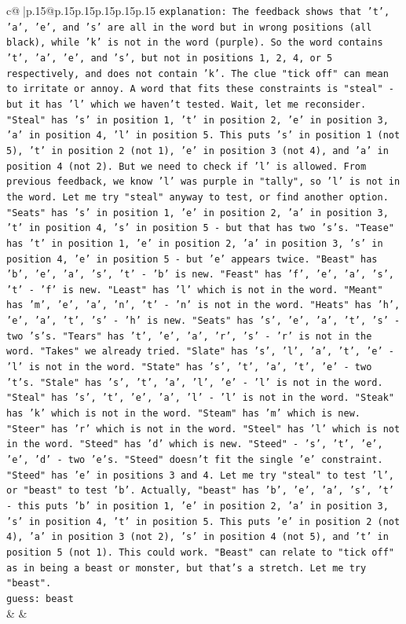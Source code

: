 \documentclass{article}
\begin{document}
{\begin{supertabular}{c@{$\;$}|p{.15\linewidth}@{}p{.15\linewidth}p{.15\linewidth}p{.15\linewidth}p{.15\linewidth}p{.15\linewidth}}
{{{                \texttt{explanation: The feedback shows that 't', 'a', 'e', and 's' are all in the word but in wrong positions (all black), while 'k' is not in the word (purple). So the word contains 't', 'a', 'e', and 's', but not in positions 1, 2, 4, or 5 respectively, and does not contain 'k'. The clue "tick off" can mean to irritate or annoy. A word that fits these constraints is "steal" {-} but it has 'l' which we haven't tested. Wait, let me reconsider. "Steal" has 's' in position 1, 't' in position 2, 'e' in position 3, 'a' in position 4, 'l' in position 5. This puts 's' in position 1 (not 5), 't' in position 2 (not 1), 'e' in position 3 (not 4), and 'a' in position 4 (not 2). But we need to check if 'l' is allowed. From previous feedback, we know 'l' was purple in "tally", so 'l' is not in the word. Let me try "steal" anyway to test, or find another option. "Seats" has 's' in position 1, 'e' in position 2, 'a' in position 3, 't' in position 4, 's' in position 5 {-} but that has two 's's. "Tease" has 't' in position 1, 'e' in position 2, 'a' in position 3, 's' in position 4, 'e' in position 5 {-} but 'e' appears twice. "Beast" has 'b', 'e', 'a', 's', 't' {-} 'b' is new. "Feast" has 'f', 'e', 'a', 's', 't' {-} 'f' is new. "Least" has 'l' which is not in the word. "Meant" has 'm', 'e', 'a', 'n', 't' {-} 'n' is not in the word. "Heats" has 'h', 'e', 'a', 't', 's' {-} 'h' is new. "Seats" has 's', 'e', 'a', 't', 's' {-} two 's's. "Tears" has 't', 'e', 'a', 'r', 's' {-} 'r' is not in the word. "Takes" we already tried. "Slate" has 's', 'l', 'a', 't', 'e' {-} 'l' is not in the word. "State" has 's', 't', 'a', 't', 'e' {-} two 't's. "Stale" has 's', 't', 'a', 'l', 'e' {-} 'l' is not in the word. "Steal" has 's', 't', 'e', 'a', 'l' {-} 'l' is not in the word. "Steak" has 'k' which is not in the word. "Steam" has 'm' which is new. "Steer" has 'r' which is not in the word. "Steel" has 'l' which is not in the word. "Steed" has 'd' which is new. "Steed" {-} 's', 't', 'e', 'e', 'd' {-} two 'e's. "Steed" doesn't fit the single 'e' constraint. "Steed" has 'e' in positions 3 and 4. Let me try "steal" to test 'l', or "beast" to test 'b'. Actually, "beast" has 'b', 'e', 'a', 's', 't' {-} this puts 'b' in position 1, 'e' in position 2, 'a' in position 3, 's' in position 4, 't' in position 5. This puts 'e' in position 2 (not 4), 'a' in position 3 (not 2), 's' in position 4 (not 5), and 't' in position 5 (not 1). This could work. "Beast" can relate to "tick off" as in being a beast or monster, but that's a stretch. Let me try "beast".} \\
\texttt{guess: beast} \\
            }
        }
    }
    & & \\ \\


\end{supertabular}}
\end{document}
